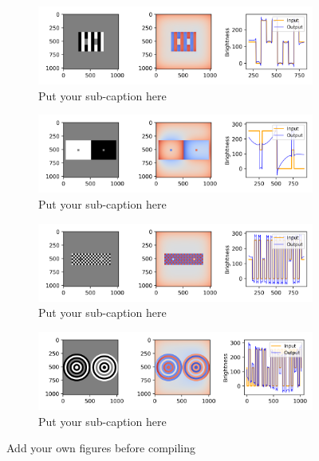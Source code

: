\begin{figure}[H]
    \centering
    \begin{subfigure}{0.8\textwidth}
        \includegraphics[width=\textwidth]{media/model_responses/odog_white_thick.png}
        \caption{Put your sub-caption here}
    \end{subfigure}
    \begin{subfigure}{0.8\textwidth}
        \includegraphics[width=\textwidth]{media/model_responses/odog_sbc_small.png}
        \caption{Put your sub-caption here}
    \end{subfigure}
    \begin{subfigure}{0.8\textwidth}
        \includegraphics[width=\textwidth]{media/model_responses/odog_checkerboard.png}
        \caption{Put your sub-caption here}
    \end{subfigure}
    \begin{subfigure}{0.8\textwidth}
        \includegraphics[width=\textwidth]{media/model_responses/odog_white_circular.png}
        \caption{Put your sub-caption here}
    \end{subfigure}
    \caption{Add your own figures before compiling}
    \label{fig:foobar}
\end{figure}

